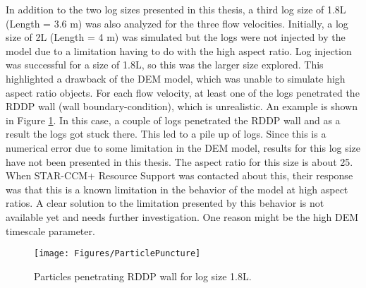 In addition to the two log sizes presented in this thesis, a third log size of 1.8L (Length  = 3.6 m) was also analyzed for the three flow velocities. Initially, a log size of 2L (Length = 4 m) was simulated but the logs were not injected by the model due to a limitation having to do with the high aspect ratio. Log injection was successful for a size of 1.8L, so this was the larger size explored. This highlighted a drawback of the DEM model, which was unable to simulate high aspect ratio objects. For each flow velocity, at least one of the logs penetrated the RDDP wall (wall boundary-condition), which is unrealistic. An example is shown in Figure \ref{fig:ParticlePuncture}. In this case, a couple of logs penetrated the RDDP wall and as a result the logs got stuck there. This led to a pile up of logs. Since this is a numerical error due to some limitation in the DEM model, results for this log size have not been presented in this thesis. The aspect ratio for this size is about 25. When STAR-CCM+ Resource Support was contacted about this, their response was that this is a known limitation in the behavior of the model at high aspect ratios. A clear solution to the limitation presented by this behavior is not available yet and needs further investigation. One reason might be the high DEM timescale parameter. %

\begin{figure}
\centering
\texttt{[image: Figures/ParticlePuncture]}
\caption{\label{fig:ParticlePuncture}Particles penetrating RDDP wall for log size 1.8L.}
\end{figure}


